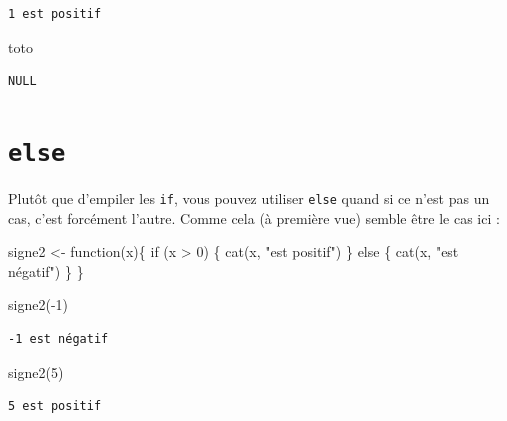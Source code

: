 \documentclass[
  letterpaper,
  DIV=11,
  numbers=noendperiod]{scrreprt}
\newenvironment{Shaded}{\begin{snugshade}}{\end{snugshade}}
\newcommand{\ControlFlowTok}[1]{\textcolor[rgb]{0.00,0.23,0.31}{#1}}
\newcommand{\DecValTok}[1]{\textcolor[rgb]{0.68,0.00,0.00}{#1}}
\newcommand{\FunctionTok}[1]{\textcolor[rgb]{0.28,0.35,0.67}{#1}}
\newcommand{\NormalTok}[1]{\textcolor[rgb]{0.00,0.23,0.31}{#1}}
\newcommand{\OtherTok}[1]{\textcolor[rgb]{0.00,0.23,0.31}{#1}}
\newcommand{\SpecialCharTok}[1]{\textcolor[rgb]{0.37,0.37,0.37}{#1}}
\newcommand{\StringTok}[1]{\textcolor[rgb]{0.13,0.47,0.30}{#1}}
\begin{document}
\begin{verbatim}
1 est positif
\end{verbatim}

\begin{Shaded}
\begin{Highlighting}[]
\NormalTok{toto}
\end{Highlighting}
\end{Shaded}

\begin{verbatim}
NULL
\end{verbatim}

\hypertarget{else}{%
\section{\texorpdfstring{\texttt{else}}{else}}\label{else}}

Plutôt que d'empiler les \texttt{if}, vous pouvez utiliser \texttt{else}
quand si ce n'est pas un cas, c'est forcément l'autre. Comme cela (à
première vue) semble être le cas ici :

\begin{Shaded}
\begin{Highlighting}[]
\NormalTok{signe2 }\OtherTok{\textless{}{-}} \ControlFlowTok{function}\NormalTok{(x)\{}
  \ControlFlowTok{if}\NormalTok{ (x }\SpecialCharTok{\textgreater{}} \DecValTok{0}\NormalTok{) \{}
    \FunctionTok{cat}\NormalTok{(x, }\StringTok{"est positif"}\NormalTok{)}
\NormalTok{  \} }\ControlFlowTok{else}\NormalTok{ \{}
    \FunctionTok{cat}\NormalTok{(x, }\StringTok{"est négatif"}\NormalTok{)}
\NormalTok{  \}}
\NormalTok{\}}

\FunctionTok{signe2}\NormalTok{(}\SpecialCharTok{{-}}\DecValTok{1}\NormalTok{)}
\end{Highlighting}
\end{Shaded}

\begin{verbatim}
-1 est négatif
\end{verbatim}

\begin{Shaded}
\begin{Highlighting}[]
\FunctionTok{signe2}\NormalTok{(}\DecValTok{5}\NormalTok{)}
\end{Highlighting}
\end{Shaded}

\begin{verbatim}
5 est positif
\end{verbatim}
\end{document}
